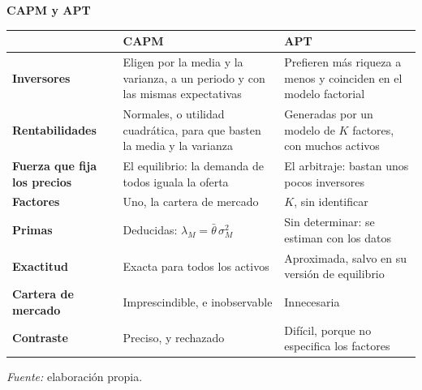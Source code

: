 \documentclass[10pt,a4paper]{article}
\begin{document}
\begin{center}\begin{minipage}{\linewidth}\centering
{\small\textbf{CAPM y APT}}\par\vspace{0.5em}
{\small\renewcommand{\arraystretch}{1.4}%
\begin{tabular}{p{3.2cm}p{5.3cm}p{5.3cm}}
\hline
 & \raggedright\textbf{CAPM} & \raggedright\textbf{APT}\tabularnewline
\hline
\raggedright\textbf{Inversores} & \raggedright Eligen por la media y la varianza, a un periodo y con las mismas expectativas & \raggedright Prefieren más riqueza a menos y coinciden en el modelo factorial\tabularnewline
\raggedright\textbf{Rentabilidades} & \raggedright Normales, o utilidad cuadrática, para que basten la media y la varianza & \raggedright Generadas por un modelo de $K$ factores, con muchos activos\tabularnewline
\raggedright\textbf{Fuerza que fija los precios} & \raggedright El equilibrio: la demanda de todos iguala la oferta & \raggedright El arbitraje: bastan unos pocos inversores\tabularnewline
\raggedright\textbf{Factores} & \raggedright Uno, la cartera de mercado & \raggedright $K$, sin identificar\tabularnewline
\raggedright\textbf{Primas} & \raggedright Deducidas: $\lambda_M=\bar\theta\,\sigma_M^2$ & \raggedright Sin determinar: se estiman con los datos\tabularnewline
\raggedright\textbf{Exactitud} & \raggedright Exacta para todos los activos & \raggedright Aproximada, salvo en su versión de equilibrio\tabularnewline
\raggedright\textbf{Cartera de mercado} & \raggedright Imprescindible, e inobservable & \raggedright Innecesaria\tabularnewline
\raggedright\textbf{Contraste} & \raggedright Preciso, y rechazado & \raggedright Difícil, porque no especifica los factores\tabularnewline
\hline
\end{tabular}}\par\vspace{0.3em}
{\small\textit{Fuente: }elaboración propia.}
\end{minipage}\end{center}
\end{document}
